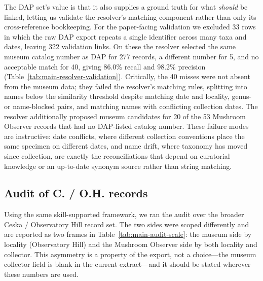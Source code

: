 The DAP set's value is that it also supplies a ground truth for what \emph{should}
be linked, letting us validate the resolver's matching component rather than only
its cross-reference bookkeeping. For the paper-facing validation we excluded 33
rows in which the raw DAP export repeats a single identifier across many taxa and
dates, leaving 322 validation links. On these the resolver selected the same
museum catalog number as DAP for 277 records, a different number for 5, and no
acceptable match for 40, giving 86.0\% recall and 98.2\% precision
(Table~\ref{tab:main-resolver-validation}). Critically, the 40 misses were not
absent from the museum data; they failed the resolver's matching rules, splitting
into names below the similarity threshold despite matching date and locality,
genus- or name-blocked pairs, and matching names with conflicting collection
dates.%
The resolver additionally proposed museum candidates for 20 of the 53 Mushroom
Observer records that had no DAP-listed catalog number. These failure modes are
instructive: date conflicts, where different collection conventions place the same
specimen on different dates, and name drift, where taxonomy has moved since
collection, are exactly the reconciliations that depend on curatorial knowledge or
an up-to-date synonym source rather than string matching.

\subsection{Audit of C. / O.H. records}

Using the same skill-supported framework, we ran the audit over the broader
Ceska / Observatory Hill record set. The two sides were scoped differently and are
reported as two frames in Table~\ref{tab:main-audit-scale}: the museum side by
locality (Observatory Hill) and the Mushroom Observer side by both locality and
collector. This asymmetry is a property of the export, not a choice---the museum
collector field is blank in the current extract---and it should be stated wherever
these numbers are used.

